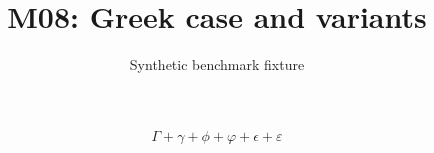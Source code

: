\documentclass{article}
\title{M08: Greek case and variants}
\author{Synthetic benchmark fixture}
\date{}
\begin{document}
\maketitle
\[\Gamma+\gamma+\phi+\varphi+\epsilon+\varepsilon\]
\end{document}
